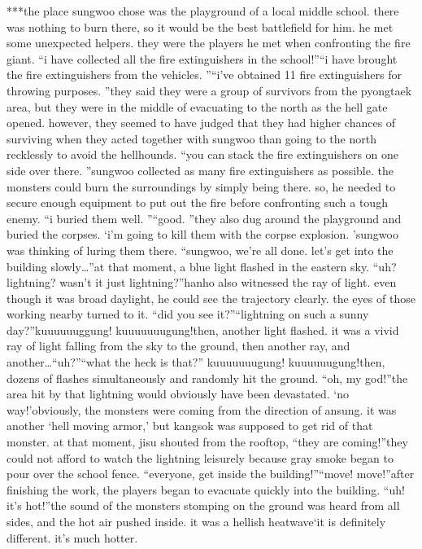 ***the place sungwoo chose was the playground of a local middle school.
 there was nothing to burn there, so it would be the best battlefield for him.
he met some unexpected helpers.
 they were the players he met when confronting the fire giant.
“i have collected all the fire extinguishers in the school!”“i have brought the fire extinguishers from the vehicles.
”“i’ve obtained 11 fire extinguishers for throwing purposes.
”they said they were a group of survivors from the pyongtaek area, but they were in the middle of evacuating to the north as the hell gate opened.
however, they seemed to have judged that they had higher chances of surviving when they acted together with sungwoo than going to the north recklessly to avoid the hellhounds.
“you can stack the fire extinguishers on one side over there.
”sungwoo collected as many fire extinguishers as possible.
 the monsters could burn the surroundings by simply being there.
 so, he needed to secure enough equipment to put out the fire before confronting such a tough enemy.
“i buried them well.
”“good.
”they also dug around the playground and buried the corpses.
‘i’m going to kill them with the corpse explosion.
’sungwoo was thinking of luring them there.
“sungwoo, we’re all done.
 let’s get into the building slowly…”at that moment, a blue light flashed in the eastern sky.
“uh? lightning? wasn’t it just lightning?”hanho also witnessed the ray of light.
 even though it was broad daylight, he could see the trajectory clearly.
 the eyes of those working nearby turned to it.
“did you see it?”“lightning on such a sunny day?”kuuuuuuggung! kuuuuuuugung!then, another light flashed.
 it was a vivid ray of light falling from the sky to the ground, then another ray, and another…“uh?”“what the heck is that?”
kuuuuuuugung! kuuuuuugung!then, dozens of flashes simultaneously and randomly hit the ground.
“oh, my god!”the area hit by that lightning would obviously have been devastated.
‘no way!’obviously, the monsters were coming from the direction of ansung.
 it was another ‘hell moving armor,’ but kangsok was supposed to get rid of that monster.
at that moment, jisu shouted from the rooftop, “they are coming!”they could not afford to watch the lightning leisurely because gray smoke began to pour over the school fence.
“everyone, get inside the building!”“move! move!”after finishing the work, the players began to evacuate quickly into the building.
“uh! it’s hot!”the sound of the monsters stomping on the ground was heard from all sides, and the hot air pushed inside.
 it was a hellish heatwave‘it is definitely different.
 it’s much hotter.
